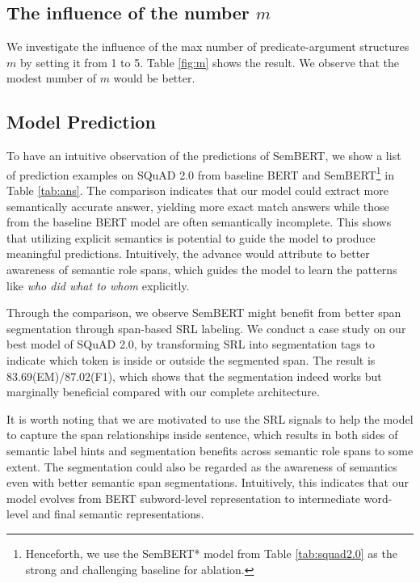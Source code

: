 \documentclass[letterpaper]{article} \usepackage{aaai20}  \usepackage{times}  \usepackage{helvet} \usepackage{courier}  \usepackage[hyphens]{url}  \usepackage{graphicx} \urlstyle{rm} \def\UrlFont{\rm}  \usepackage{graphicx}  \frenchspacing  \usepackage{amssymb}
\begin{document}
\subsection{The influence of the number $m$}
We investigate the influence of the max number of predicate-argument structures $m$ by setting it from 1 to 5. Table \ref{fig:m} shows the result. We observe that the modest number of $m$ would be better. 


\subsection{Model Prediction}\label{span_out}
To have an intuitive observation of the predictions of SemBERT, we show a list of prediction examples on SQuAD 2.0 from baseline BERT and SemBERT\footnote[11]{Henceforth, we use the SemBERT* model from Table \ref{tab:squad2.0} as the strong and challenging baseline for ablation.} in Table \ref{tab:ans}. The comparison indicates that our model could extract more semantically accurate answer, yielding more exact match answers while those from the baseline BERT model are often semantically incomplete. This shows that utilizing explicit semantics is potential to guide the model to produce meaningful predictions. 
Intuitively, the advance would attribute to better awareness of semantic role spans, which guides the model to learn the patterns like \emph{who did what to whom} explicitly. 

Through the comparison, we observe SemBERT might benefit from better span segmentation through span-based SRL labeling. We conduct a case study on our best model of SQuAD 2.0, by transforming SRL into segmentation tags to indicate which token is inside or outside the segmented span. The result is 83.69(EM)/87.02(F1), which shows that the segmentation indeed works but marginally beneficial compared with our complete architecture.

It is worth noting that we are motivated to use the SRL signals to help the model to capture the span relationships inside sentence, which results in both sides of semantic label hints and segmentation benefits across semantic role spans to some extent. The segmentation could also be regarded as the awareness of semantics even with better semantic span segmentations. Intuitively, this indicates that our model evolves from BERT subword-level representation to intermediate word-level and final semantic representations.
\end{document}
